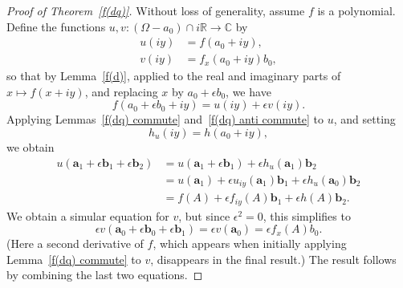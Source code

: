 \documentclass[12pt,reqno]{amsart}
\begin{document}
\begin{proof}[Proof of Theorem~\ref{f(dq)}]
Without loss of generality, assume $f$ is a polynomial.  Define the functions $u,v:(\Omega-a_0) \cap i\mathbb R \to \mathbb C$ by
\begin{align}
u(iy) &= f(a_0 + iy) , \\
v(iy) &= f_{x}(a_0 + iy) b_0,
\end{align}
so that by Lemma~\ref{f(d)}, applied to the real and imaginary parts of $x \mapsto f(x + iy)$, and replacing $x$ by $a_0 + \epsilon b_0$, we have
\begin{equation}
f(a_0 + \epsilon b_0 + i y) = u(iy) + \epsilon v(iy) .
\end{equation}
Applying Lemmas~\ref{f(dq) commute} and~\ref{f(dq) anti commute} to $u$, and setting
\begin{equation}
h_u(iy) = h(a_0 + iy),
\end{equation}
we obtain
\begin{equation}
\begin{aligned}
u(\bm a_1 + \epsilon \bm b_1 + \epsilon \bm b_2) &= u(\bm a_1 + \epsilon \bm b_1) + \epsilon h_u(\bm a_1) \bm b_2 \\
&= u(\bm a_1) + \epsilon u_{iy}(\bm a_1) \bm b_1 + \epsilon h_u(\bm a_0) \bm b_2 \\
&= f(A) + \epsilon f_{iy}(A) \bm b_1 + \epsilon h(A) \bm b_2 .
\end{aligned}
\end{equation}
We obtain a simular equation for $v$, but since $\epsilon^2 = 0$, this simplifies to
\begin{equation}
\epsilon v(\bm a_0 + \epsilon \bm b_0 + \epsilon \bm b_1) = \epsilon v(\bm a_0) = \epsilon f_x(A) b_0 .
\end{equation}
(Here a second derivative of $f$, which appears when initially applying Lemma~\ref{f(dq) commute} to $v$, disappears in the final result.)  The result follows by combining the last two equations.
\end{proof}
\end{document}
